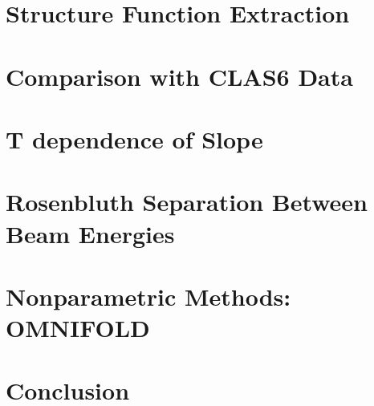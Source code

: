 \section{Structure Function Extraction}
\section{Comparison with CLAS6 Data}
\section{T dependence of Slope}
\section{Rosenbluth Separation Between Beam Energies}
\section{Nonparametric Methods: OMNIFOLD}
\section{Conclusion}
